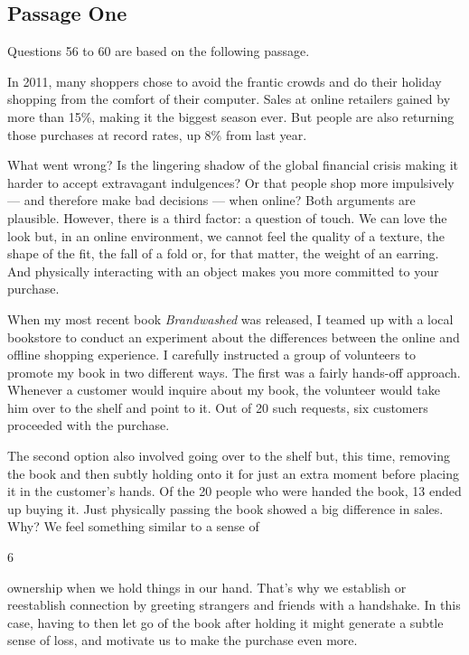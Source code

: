 \documentclass[UTF8,11pt]{ctexart}
\begin{document}
\subsection*{Passage One}


Questions 56 to 60 are based on the following passage.


In 2011, many shoppers chose to avoid the frantic crowds and do their holiday shopping from the comfort of their computer. Sales at online retailers gained by more than 15\%, making it the biggest season ever. But people are also returning those purchases at record rates, up 8\% from last year.


What went wrong? Is the lingering shadow of the global financial crisis making it harder to accept extravagant indulgences? Or that people shop more impulsively — and therefore make bad decisions — when online? Both arguments are plausible. However, there is a third factor: a question of touch. We can love the look but, in an online environment, we cannot feel the quality of a texture, the shape of the fit, the fall of a fold or, for that matter, the weight of an earring. And physically interacting with an object makes you more committed to your purchase.


When my most recent book\textit{ Brandwashed} was released, I teamed up with a local bookstore to conduct an experiment about the differences between the online and offline shopping experience. I carefully instructed a group of volunteers to promote my book in two different ways. The first was a fairly hands-off approach. Whenever a customer would inquire about my book, the volunteer would take him over to the shelf and point to it. Out of 20 such requests, six customers proceeded with the purchase.


The second option also involved going over to the shelf but, this time, removing the book and then subtly holding onto it for just an extra moment before placing it in the customer’s hands. Of the 20 people who were handed the book, 13 ended up buying it. Just physically passing the book showed a big difference in sales. Why? We feel something similar to a sense of


6


ownership when we hold things in our hand. That’s why we establish or reestablish connection by greeting strangers and friends with a handshake. In this case, having to then let go of the book after holding it might generate a subtle sense of loss, and motivate us to make the purchase even more.
\end{document}
